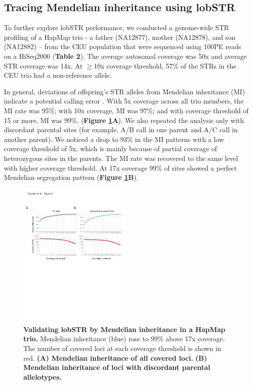 \subsection{Tracing Mendelian inheritance using lobSTR}
To further explore lobSTR performance, we conducted a genome-wide STR profiling of a HapMap trio - a father (NA12877), mother (NA12878), and son (NA12882) -- from the CEU population that were sequenced using 100PE reads on a HiSeq2000 (\textbf{Table 2}). The average autosomal coverage was 50x and average STR coverage was 14x. At $\geq$10x coverage threshold, 57\% of the STRs in the CEU trio had a non-reference allele. 

In general, deviations of offspring's STR alleles from Mendelian inheritance (MI) indicate a potential calling error \cite{EwenBahloTreloarEtAl2000}. With 5x coverage across all trio members, the MI rate was 95\%; with 10x coverage, MI was 97\%; and with coverage threshold of 15 or more, MI was 99\%. (\textbf{Figure \ref{fig:lobfig4}A}). We also repeated the analysis only with discordant parental sites (for example, A/B call in one parent and A/C call in another parent). We noticed a drop to 93\% in the MI patterns with a low coverage threshold of 5x, which is mainly because of partial coverage of heterozygous sites in the parents. The MI rate was recovered to the same level with higher coverage threshold. At 17x coverage 99\% of sites showed a perfect Mendelian segregation pattern (\textbf{Figure \ref{fig:lobfig4}B}). 

\begin{figure}[h!]
\centering
\label{fig:lobfig4}
\includegraphics[width=0.5\textwidth]{Figures/Chapter2/Fig4.pdf}
\caption{\textbf{Validating lobSTR by Mendelian inheritance in a HapMap trio.} Mendelian inheritance (blue) rose to 99\% above 17x coverage. The number of covered loci at each coverage threshold is shown in red. \textbf{(A) Mendelian inheritance of all covered loci.} \textbf{(B) Mendelian inheritance of loci with discordant parental allelotypes.}}
\end{figure}

